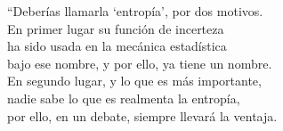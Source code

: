 %
\newcommand{\SZ}[1]{{\color{red}\bf #1}}
%
\def\A{\mathcal{A}}
\def\B{\mathcal{B}}
\def\C{\mathcal{C}}
\def\D{\mathcal{D}}
\def\E{\mathcal{E}}
\def\H{\mathcal{H}}
\def\P{\mathcal{P}}
\def\X{\mathcal{X}}
\def\Y{\mathcal{Y}}
%
\def\Cset{\mathbb{C}}
\def\Nset{\mathbb{N}}
\def\Rset{\mathbb{R}}
\def\Zset{\mathbb{Z}}
%
\def\Esp{\operatorname{E}}
\def\e{\operatorname{e}}
\def\Jac{\operatorname{J}}
\def\Hess{\mathcal{H}}
\def\Tr{\operatorname{Tr}}
\def\diag{\operatorname{diag}}
\def\Gauss{\mathcal{N}}
\def\argmax{\operatorname*{argm\acute{a}x}}
%
\def\un{\mathbbm{1}}
\def\opt{\mathrm{opt}}
\def\sh{\mathrm{sh}}
\def\fa{\mathrm{fa}}
\def\huf{\mathrm{huf}}
%
\def\ie{{\it i. e.,}\xspace}
%
%
\newenvironment{propiedades}
{\begin{enumerate}[label={[P\arabic*]}]\setcounter{enumi}{\value{propiedad}}}
{\setcounter{propiedad}{\value{enumi}}\end{enumerate}}
%
\newenvironment{propiedadesC}
{\begin{enumerate}[label={[P'\arabic*]}]}
{\end{enumerate}}





\begin{epigrafe}
  ``Deber\'ias llamarla `entrop\'ia', por dos motivos.\\
  En  primer  lugar  su funci\'on  de  incerteza\\
  ha  sido  usada en  la  mec\'anica  estad\'istica\\
  bajo ese nombre, y por ello, ya tiene un nombre.\\
  En segundo lugar,  y lo que  es m\'as importante,\\
  nadie sabe  lo que es realmenta la entrop\'ia,\\
  por ello, en un debate, siempre llevar\'a la ventaja.
\end{epigrafe}



